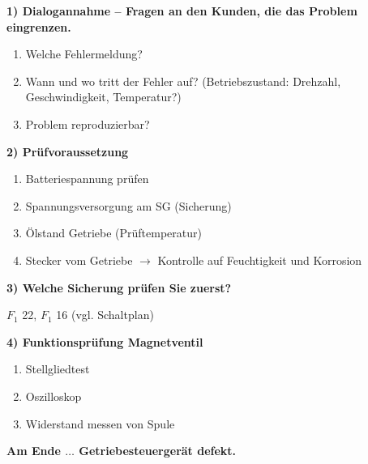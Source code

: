\textbf{1) Dialogannahme -- Fragen an den Kunden, die das Problem
eingrenzen.}

\begin{enumerate}
\item
  Welche Fehlermeldung?
\item
  Wann und wo tritt der Fehler auf? (Betriebszustand: Drehzahl,
  Geschwindigkeit, Temperatur?)
\item
  Problem reproduzierbar?
\end{enumerate}

\textbf{2) Prüfvoraussetzung}

\begin{enumerate}
\item
  Batteriespannung prüfen
\item
  Spannungsversorgung am SG (Sicherung)
\item
  Ölstand Getriebe (Prüftemperatur)
\item
  Stecker vom Getriebe $\to$ Kontrolle auf Feuchtigkeit und Korrosion
\end{enumerate}

\textbf{3) Welche Sicherung prüfen Sie zuerst?}

$F_1$ 22, $F_1$ 16 (vgl. Schaltplan)

\textbf{4) Funktionsprüfung Magnetventil}

\begin{enumerate}
\item
  Stellgliedtest
\item
  Oszilloskop
\item
  Widerstand messen von Spule
\end{enumerate}

\textbf{Am Ende $\dots$ Getriebesteuergerät defekt.}
